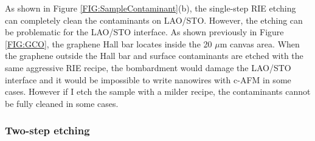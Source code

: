 \documentclass[pdflatex, sectionletters, 12pt]{pittetd}    %
\begin{document}

As shown in Figure \ref{FIG:SampleContaminant}(b), the single-step RIE etching can completely clean the contaminants on LAO/STO. However, the etching can be problematic for the LAO/STO interface. As shown previously in Figure \ref{FIG:GCO}, the graphene Hall bar locates inside the 20 $\mu$m canvas area. When the graphene outside the Hall bar and surface contaminants are etched with the same aggressive RIE recipe, the bombardment would damage the LAO/STO interface and it would be impossible to write nanowires with c-AFM in some cases. However if I etch the sample with a milder recipe, the contaminants cannot be fully cleaned in some cases. 

\subsubsection{Two-step etching}
\end{document}
